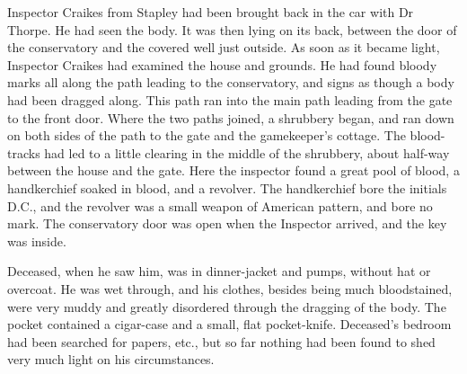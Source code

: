 Inspector Craikes from Stapley had been brought back in the car with Dr Thorpe. He had seen the body. It was then lying on its back, between the door of the conservatory and the covered well just outside.  As soon as it became light, Inspector Craikes had examined the house and grounds. He had found bloody marks all along the path leading to the conservatory, and signs as though a body had been dragged along.  This path ran into the main path leading from the gate to the front door.  Where the two paths joined, a shrubbery began, and ran down on both sides of the path to the gate and the gamekeeper's cottage. The blood-tracks had led to a little clearing in the middle of the shrubbery, about half-way between the house and the gate. Here the inspector found a great pool of blood, a handkerchief soaked in blood, and a revolver. The handkerchief bore the initials D.C., and the revolver was a small weapon of American pattern, and bore no mark.  The conservatory door was open when the Inspector arrived, and the key was inside.

Deceased, when he saw him, was in dinner-jacket and pumps, without hat or overcoat. He was wet through, and his clothes, besides being much bloodstained, were very muddy and greatly disordered through the dragging of the body. The pocket contained a cigar-case and a small, flat pocket-knife. Deceased's bedroom had been searched for papers, etc., but so far nothing had been found to shed very much light on his circumstances.

